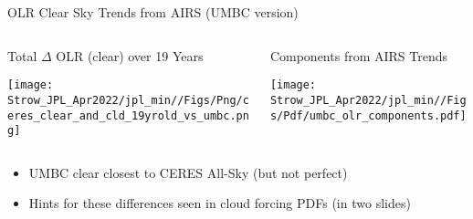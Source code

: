 \documentclass[10pt,t]{beamer}
\begin{document}
\begin{frame}[label={sec:orgccfa059}]{OLR Clear Sky Trends from AIRS (UMBC version)}
\vspace{-0.1in}

\begin{columns}
\begin{column}{0.5\columnwidth}
\begin{block}{\small Total \(\Delta\) OLR (clear) over 19 Years}
\vspace{-0.1in}
\begin{center}
\texttt{[image: Strow\_JPL\_Apr2022/jpl\_min//Figs/Png/ceres\_clear\_and\_cld\_19yrold\_vs\_umbc.png]}
\end{center}
\end{block}
\end{column}

\begin{column}{0.5\columnwidth}
\begin{block}{\small Components from AIRS Trends}
\vspace{-0.1in}
\begin{center}
\texttt{[image: Strow\_JPL\_Apr2022/jpl\_min//Figs/Pdf/umbc\_olr\_components.pdf]}
\end{center}
\end{block}
\end{column}
\end{columns}

\vspace{-0.05in}

\begin{itemize}
\item UMBC clear closest to CERES All-Sky (but not perfect)
\item Hints for these differences seen in cloud forcing PDFs (in two slides)
\end{itemize}
\end{frame}
\end{document}
